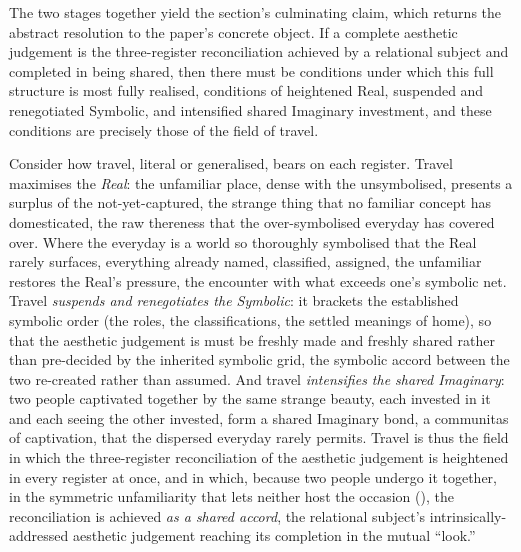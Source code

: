 The two stages together yield the section's culminating claim, which returns the abstract resolution to the paper's concrete object. If a complete aesthetic judgement is the three-register reconciliation achieved by a relational subject and completed in being shared, then there must be conditions under which this full structure is most fully realised, conditions of heightened Real, suspended and renegotiated Symbolic, and intensified shared Imaginary investment, and these conditions are precisely those of the field of travel.

Consider how travel, literal or generalised, bears on each register. Travel maximises the \emph{Real}: the unfamiliar place, dense with the unsymbolised, presents a surplus of the not-yet-captured, the strange thing that no familiar concept has domesticated, the raw thereness that the over-symbolised everyday has covered over. Where the everyday is a world so thoroughly symbolised that the Real rarely surfaces, everything already named, classified, assigned, the unfamiliar restores the Real's pressure, the encounter with what exceeds one's symbolic net. Travel \emph{suspends and renegotiates the Symbolic}: it brackets the established symbolic order (the roles, the classifications, the settled meanings of home), so that the aesthetic judgement is must be freshly made and freshly shared rather than pre-decided by the inherited symbolic grid, the symbolic accord between the two re-created rather than assumed. And travel \emph{intensifies the shared Imaginary}: two people captivated together by the same strange beauty, each invested in it and each seeing the other invested, form a shared Imaginary bond, a communitas of captivation, that the dispersed everyday rarely permits. Travel is thus the field in which the three-register reconciliation of the aesthetic judgement is heightened in every register at once, and in which, because two people undergo it together, in the symmetric unfamiliarity that lets neither host the occasion (), the reconciliation is achieved \emph{as a shared accord}, the relational subject's intrinsically-addressed aesthetic judgement reaching its completion in the mutual ``look.''


